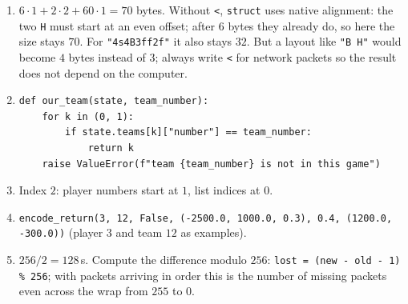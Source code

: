 \begin{enumerate}[label=\textbf{\ansnum.\arabic*}]
  \item $6\cdot1+2\cdot2+60\cdot1=70$ bytes. Without \texttt{<}, \texttt{struct} uses native alignment: the two \texttt{H} must start at an even offset; after $6$ bytes they already do, so here the size stays $70$. For \verb!"4s4B3ff2f"! it also stays $32$. But a layout like \verb!"B H"! would become $4$ bytes instead of $3$; always write \texttt{<} for network packets so the result does not depend on the computer.
  \item
\begin{verbatim}
def our_team(state, team_number):
    for k in (0, 1):
        if state.teams[k]["number"] == team_number:
            return k
    raise ValueError(f"team {team_number} is not in this game")
\end{verbatim}
  \item Index $2$: player numbers start at $1$, list indices at $0$.
  \item \verb!encode_return(3, 12, False, (-2500.0, 1000.0, 0.3), 0.4, (1200.0, -300.0))! (player $3$ and team $12$ as examples).
  \item $256/2=128$\,s. Compute the difference modulo $256$: \verb!lost = (new - old - 1) % 256!; with packets arriving in order this is the number of missing packets even across the wrap from $255$ to $0$.
\end{enumerate}
